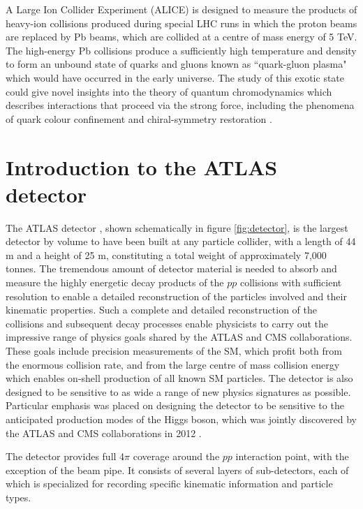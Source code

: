 A Large Ion Collider Experiment (ALICE) \cite{ALICE} is designed to measure the products of heavy-ion collisions produced during special LHC runs in which the proton beams are replaced by Pb beams, which are collided at a centre of mass energy of 5 TeV. The high-energy Pb collisions produce a sufficiently high temperature and density to form an unbound state of quarks and gluons known as ``quark-gluon plasma" which would have occurred in the early universe. The study of this exotic state could give novel insights into the theory of quantum chromodynamics which describes interactions that proceed via the strong force, including the phenomena of quark colour confinement and chiral-symmetry restoration \cite{quark_confinement, Karsch:845568}.


\section{Introduction to the ATLAS detector}
\label{sec:ATLAS_detector_intro}

The ATLAS detector \cite{atlas}, shown schematically in figure \ref{fig:detector}, is the largest detector by volume to have been built at any particle collider, with a length of 44 m and a height of 25 m, constituting a total weight of approximately 7,000 tonnes. The tremendous amount of detector material is needed to absorb and measure the highly energetic decay products of the $pp$ collisions with sufficient resolution to enable a detailed reconstruction of the particles involved and their kinematic properties. Such a complete and detailed reconstruction of the collisions and subsequent decay processes enable physicists to carry out the impressive range of physics goals shared by the ATLAS and CMS collaborations. These goals include precision measurements of the SM, which profit both from the enormous collision rate, and from the large centre of mass collision energy which enables on-shell production of all known SM particles. The detector is also designed to be sensitive to as wide a range of new physics signatures as possible. Particular emphasis was placed on designing the detector to be sensitive to the anticipated production modes of the Higgs boson, which was jointly discovered by the ATLAS and CMS collaborations in 2012 \cite{atlas_higgs, cms_higgs}. 

The detector provides full 4$\pi$ coverage around the $pp$ interaction point, with the exception of the beam pipe. It consists of several layers of sub-detectors, each of which is specialized for recording specific kinematic information and particle types.

